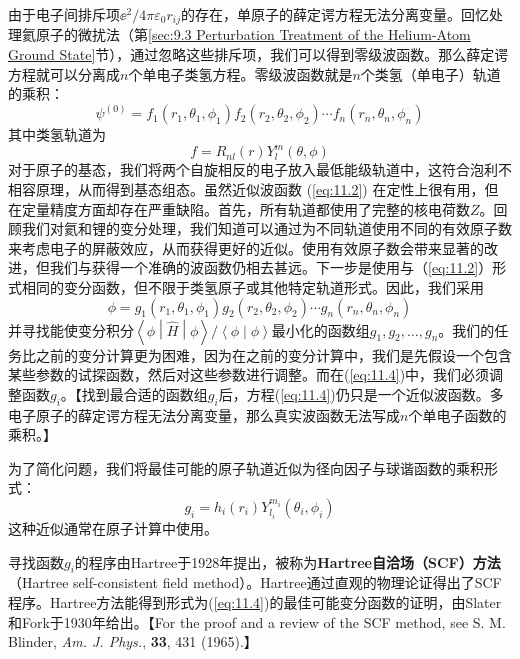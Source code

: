     由于电子间排斥项$\ee ^2 / 4\pi\varepsilon_0r_{ij}$的存在，单原子的薛定谔方程无法分离变量。回忆处理氦原子的微扰法（第\ref{sec:9.3 Perturbation Treatment of the Helium-Atom Ground State}节），通过忽略这些排斥项，我们可以得到零级波函数。那么薛定谔方程就可以分离成$n$个单电子类氢方程。零级波函数就是$n$个类氢（单电子）轨道的乘积：
    \begin{equation}
        \psi^{(0)} = f_1(r_1, \theta_1, \phi_1) f_2(r_2, \theta_2, \phi_2) \cdots f_n(r_n, \theta_n, \phi_n)
        \label{eq:11.2}
    \end{equation}
    其中类氢轨道为
    \begin{equation}
        f = R_{nl}(r) Y_{l}^m(\theta, \phi)
        \label{eq:11.3}
    \end{equation}
    对于原子的基态，我们将两个自旋相反的电子放入最低能级轨道中，这符合泡利不相容原理，从而得到基态组态。虽然近似波函数 (\ref{eq:11.2}) 在定性上很有用，但在定量精度方面却存在严重缺陷。首先，所有轨道都使用了完整的核电荷数$Z$。回顾我们对氦和锂的变分处理，我们知道可以通过为不同轨道使用不同的有效原子数来考虑电子的屏蔽效应，从而获得更好的近似。使用有效原子数会带来显著的改进，但我们与获得一个准确的波函数仍相去甚远。下一步是使用与（\ref{eq:11.2}）形式相同的变分函数，但不限于类氢原子或其他特定轨道形式。因此，我们采用
    \begin{equation}
        \phi = g_1\left(r_1, \theta_1, \phi_1\right) g_2\left(r_2, \theta_2, \phi_2\right) \cdots g_n\left(r_n, \theta_n, \phi_n\right)
        \label{eq:11.4}
    \end{equation}
    并寻找能使变分积分$\left\langle \phi \middle| \hat{H} \middle| \phi \right\rangle \big/ \left\langle \phi \middle| \phi \right\rangle$最小化的函数组$g_1, g_2, \ldots, g_n$。我们的任务比之前的变分计算更为困难，因为在之前的变分计算中，我们是先假设一个包含某些参数的试探函数，然后对这些参数进行调整。而在(\ref{eq:11.4})中，我们必须调整函数$g_i$。【找到最合适的函数组$g_i$后，方程(\ref{eq:11.4})仍只是一个近似波函数。多电子原子的薛定谔方程无法分离变量，那么真实波函数无法写成$n$个单电子函数的乘积。】

    为了简化问题，我们将最佳可能的原子轨道近似为径向因子与球谐函数的乘积形式：
    \begin{equation}
        g_i = h_i(r_i) Y_{l_i}^{m_i}(\theta_i, \phi_i)
        \label{eq:11.5}
    \end{equation}
    这种近似通常在原子计算中使用。

    寻找函数$g_i$的程序由Hartree于1928年提出，被称为\textbf{Hartree自洽场（SCF）方法}（Hartree self-consistent field method）。Hartree通过直观的物理论证得出了SCF程序。Hartree方法能得到形式为(\ref{eq:11.4})的最佳可能变分函数的证明，由Slater和Fork于1930年给出。【For the proof and a review of the SCF method, see S. M. Blinder, \textit{Am. J. Phys.}, \textbf{33}, 431 (1965).】

